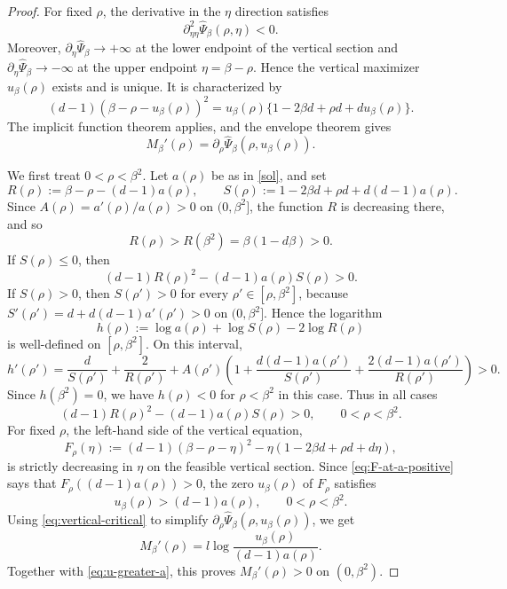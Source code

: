 \documentclass[11pt]{amsart}
\theoremstyle{plain}
\numberwithin{equation}{section}
\numberwithin{theorem}{section}
\numberwithin{figure}{section}
\begin{document}
\begin{proof}
For fixed \(\rho\), the derivative in the \(\eta\) direction satisfies
\[
  \partial_{\eta\eta}^2\widehat\Psi_\beta(\rho,\eta)<0.
\]
Moreover, \(\partial_\eta\widehat\Psi_\beta\to+\infty\) at the lower endpoint of
the vertical section and
\(\partial_\eta\widehat\Psi_\beta\to-\infty\) at the upper endpoint
\(\eta=\beta-\rho\).  Hence the vertical maximizer \(u_\beta(\rho)\) exists and is
unique.  It is characterized by
\begin{equation}\label{eq:vertical-critical}
  (d-1)(\beta-\rho-u_\beta(\rho))^2
  =u_\beta(\rho)\{1-2\beta d+\rho d+d u_\beta(\rho)\}.
\end{equation}
The implicit function theorem applies, and the envelope theorem gives
\begin{equation}\label{eq:Mprime-envelope}
  M_\beta'(\rho)=\partial_\rho\widehat\Psi_\beta(\rho,u_\beta(\rho)).
\end{equation}

We first treat \(0<\rho<\beta^2\).  Let \(a(\rho)\) be as in \eqref{sol}, and set
\[
  R(\rho):=\beta-\rho-(d-1)a(\rho),
  \qquad
  S(\rho):=1-2\beta d+\rho d+d(d-1)a(\rho).
\]
Since \(A(\rho)=a'(\rho)/a(\rho)>0\) on \((0,\beta^2]\), the function \(R\) is decreasing
there, and so
\[
  R(\rho)>R(\beta^2)=\beta(1-d\beta)>0.
\]
If \(S(\rho)\le0\), then
\[
  (d-1)R(\rho)^2-(d-1)a(\rho)S(\rho)>0.
\]
If \(S(\rho)>0\), then \(S(\rho')>0\) for every
\(\rho'\in[\rho,\beta^2]\), because \(S'(\rho')=d+d(d-1)a'(\rho')>0\) on
\((0,\beta^2]\).  Hence the logarithm
\[
  h(\rho):=\log a(\rho)+\log S(\rho)-2\log R(\rho)
\]
is well-defined on \([\rho,\beta^2]\).  On this interval,
\[
  h'(\rho')
  =\frac d{S(\rho')}+\frac2{R(\rho')}
  +A(\rho')\left(1+\frac{d(d-1)a(\rho')}{S(\rho')}
  +\frac{2(d-1)a(\rho')}{R(\rho')}\right)>0.
\]
Since \(h(\beta^2)=0\), we have \(h(\rho)<0\) for \(\rho<\beta^2\) in this case.  Thus in
all cases
\begin{equation}\label{eq:F-at-a-positive}
  (d-1)R(\rho)^2-(d-1)a(\rho)S(\rho)>0,
  \qquad 0<\rho<\beta^2.
\end{equation}
For fixed \(\rho\), the left-hand side of the vertical equation,
\[
  F_\rho(\eta):=(d-1)(\beta-\rho-\eta)^2
  -\eta(1-2\beta d+\rho d+d\eta),
\]
is strictly decreasing in \(\eta\) on the feasible vertical section.  Since
\eqref{eq:F-at-a-positive} says that
\(F_\rho((d-1)a(\rho))>0\), the zero \(u_\beta(\rho)\) of \(F_\rho\) satisfies
\begin{equation}\label{eq:u-greater-a}
  u_\beta(\rho)>(d-1)a(\rho),
  \qquad 0<\rho<\beta^2.
\end{equation}
Using \eqref{eq:vertical-critical} to simplify
\(\partial_\rho\widehat\Psi_\beta(\rho,u_\beta(\rho))\), we get
\begin{equation}\label{eq:Mprime-a-formula}
  M_\beta'(\rho)=l\log\frac{u_\beta(\rho)}{(d-1)a(\rho)}.
\end{equation}
Together with \eqref{eq:u-greater-a}, this proves \(M_\beta'(\rho)>0\) on
\((0,\beta^2)\).


\end{proof}
\end{document}
